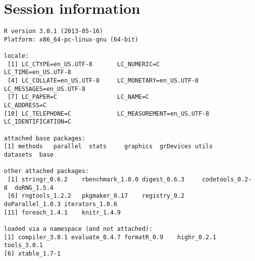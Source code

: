 \documentclass[a4paper,12pt]{article}\usepackage[]{graphicx}\usepackage[]{color}
\makeatletter
\newenvironment{kframe}{%
 \def\at@end@of@kframe{}%
 \ifinner\ifhmode%
  \def\at@end@of@kframe{\end{minipage}}%
  \begin{minipage}{\columnwidth}%
 \fi\fi%
 \def\FrameCommand##1{\hskip\@totalleftmargin \hskip-\fboxsep
 \colorbox{shadecolor}{##1}\hskip-\fboxsep
     \hskip-\linewidth \hskip-\@totalleftmargin \hskip\columnwidth}%
 \MakeFramed {\advance\hsize-\width
   \@totalleftmargin\z@ \linewidth\hsize
   \@setminipage}}%
 {\par\unskip\endMakeFramed%
 \at@end@of@kframe}
\newenvironment{knitrout}{}{} %
\makeatother
\begin{document}
\section*{Session information}
\begin{knitrout}\footnotesize
{}\color{fgcolor}\begin{kframe}
\begin{verbatim}
R version 3.0.1 (2013-05-16)
Platform: x86_64-pc-linux-gnu (64-bit)

locale:
 [1] LC_CTYPE=en_US.UTF-8       LC_NUMERIC=C               LC_TIME=en_US.UTF-8       
 [4] LC_COLLATE=en_US.UTF-8     LC_MONETARY=en_US.UTF-8    LC_MESSAGES=en_US.UTF-8   
 [7] LC_PAPER=C                 LC_NAME=C                  LC_ADDRESS=C              
[10] LC_TELEPHONE=C             LC_MEASUREMENT=en_US.UTF-8 LC_IDENTIFICATION=C       

attached base packages:
[1] methods   parallel  stats     graphics  grDevices utils     datasets  base     

other attached packages:
 [1] stringr_0.6.2    rbenchmark_1.0.0 digest_0.6.3     codetools_0.2-8  doRNG_1.5.4     
 [6] rngtools_1.2.2   pkgmaker_0.17    registry_0.2     doParallel_1.0.3 iterators_1.0.6 
[11] foreach_1.4.1    knitr_1.4.9     

loaded via a namespace (and not attached):
[1] compiler_3.0.1 evaluate_0.4.7 formatR_0.9    highr_0.2.1    tools_3.0.1   
[6] xtable_1.7-1  
\end{verbatim}
\end{kframe}
\end{knitrout}


\printbibliography[heading=bibintoc]
\end{document}
